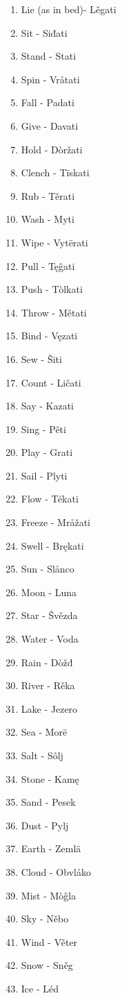 \begin{multicols}{2}
\begin{enumerate}
	\item Lie (as in bed)- Lěgati
	\item Sit - Siđati
	\item Stand - Stati
	\item Spin - Vråtati
	\item Fall - Padati
	\item Give - Davati
	\item Hold - Dòržati
	\item Clench - Tïskati
	\item Rub - Těrati
	\item Wash - Myti
	\item Wipe - Vytërati
	\item Pull - Tęĝati
	\item Push - Tòlkati
	\item Throw - Mětati
	\item Bind - Vęzati
	\item Sew - Šiti
	\item Count - Ličati
	\item Say - Kazati
	\item Sing - Pěti
	\item Play - Grati
	\item Sail - Plyti
	\item Flow - Tékati
	\item Freeze - Mråžati
	\item Swell - Brękati
	\item Sun - Slånco
	\item Moon - Luna
	\item Star - Ŝvězda
	\item Water - Voda
	\item Rain - Dòžđ
	\item River - Rěka
	\item Lake - Jezero
	\item Sea - Morë
	\item Salt - Sôlj
	\item Stone - Kamę
	\item Sand - Pesek
	\item Dust - Pylj
	\item Earth - Zemlä
	\item Cloud - Obvlåko
	\item Mist - Mòĝla
	\item Sky - Něbo
	\item Wind - Věter
	\item Snow - Sněg
	\item Ice - Léd

\end{enumerate}
\end{multicols}
